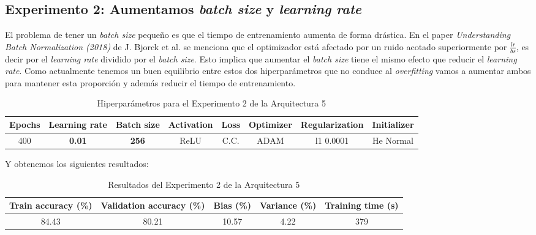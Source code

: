 \documentclass{article}
\begin{document}
		\subsection{Experimento 2: Aumentamos \textit{batch size} y \textit{learning rate}}
		\label{d-s-a5-e2}
			El problema de tener un \textit{batch size} peque\~no es que el tiempo de entrenamiento aumenta de forma dr\'astica. En el paper \textit{Understanding Batch Normalization (2018)} de J. Bjorck et al. se menciona que el optimizador est\'a afectado por un ruido acotado superiormente por $\frac{lr}{bs}$, es decir por el \textit{learning rate} dividido por el \textit{batch size}. Esto implica que aumentar el \textit{batch size} tiene el mismo efecto que reducir el \textit{learning rate}. Como actualmente tenemos un buen equilibrio entre estos dos hiperpar\'ametros que no conduce al \textit{overfitting} vamos a aumentar ambos para mantener esta proporci\'on y adem\'as reducir el tiempo de entrenamiento.
		
			\begin{table}[!h]
				\begin{center}
					\begin{tabular}{| c | c | c | c | c | c | c | c |}
						\textbf{Epochs} & \textbf{Learning rate} & \textbf{Batch size} & \textbf{Activation} & \textbf{Loss} & \textbf{Optimizer} & \textbf{Regularization} & \textbf{Initializer}\\ \hline
						 400 & \textbf{0.01} & \textbf{256} & ReLU & C.C. & ADAM & l1 0.0001 & He Normal
					\end{tabular}
					\caption{Hiperpar\'ametros para el Experimento 2 de la Arquitectura 5}
					\label{tab:hip-d-a5-e2}
				\end{center}
			\end{table}
			\newpage
			Y obtenemos los siguientes resultados:
			\begin{table}[!h]
				\begin{center}
					\begin{tabular}{| c | c | c | c | c |}
						\textbf{Train accuracy (\%)} & \textbf{Validation accuracy (\%)} & \textbf{Bias (\%)} & \textbf{Variance (\%)} & \textbf{Training time (s)} \\ \hline
						84.43 & 80.21 & 10.57 & 4.22 & 379\\ \hline
					\end{tabular}
					\caption{Resultados del Experimento 2 de la Arquitectura 5}
					\label{tab:res-d-a5-e2}
				\end{center}
			\end{table}
		    
\end{document}
